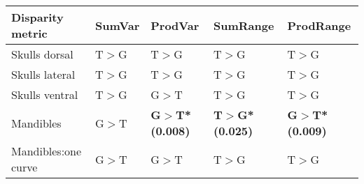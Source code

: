 

\begin{tabular}[t]{l l l l l  }		
\hline
\textbf{Disparity metric} & \textbf{SumVar} & \textbf{ProdVar} & \textbf{SumRange} & \textbf{ProdRange} \\
\hline
Skulls dorsal & T$>$G & T$>$G & T$>$G & T$>$G \\
Skulls lateral	& T$>$G & T$>$G & T$>$G & T$>$G \\
Skulls ventral & T$>$G & G$>$T & T$>$G & T$>$G \\
Mandibles & G$>$T & \textbf{G$>$T* (0.008)} & \textbf{T$>$G* (0.025)} & \textbf{G$>$T* (0.009)}\\
Mandibles:one curve & G$>$T & G$>$T & T$>$G & T$>$G\\
\hline
\end{tabular}